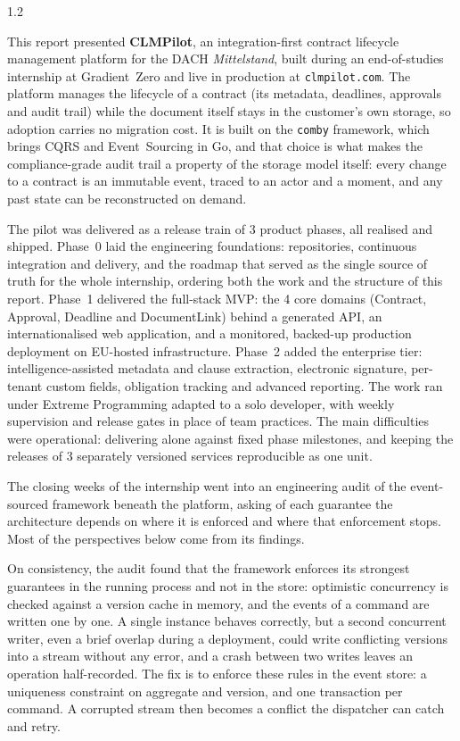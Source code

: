 \begin{spacing}{1.2}

This report presented \textbf{CLMPilot}, an integration-first contract
lifecycle management platform for the DACH \textit{Mittelstand}, built
during an end-of-studies internship at Gradient~Zero and live in
production at \texttt{clmpilot.com}. The platform manages the lifecycle
of a contract (its metadata, deadlines, approvals and audit trail)
while the document itself stays in the customer's own storage, so
adoption carries no migration cost. It is built on the \texttt{comby}
framework, which brings CQRS and Event~Sourcing in Go, and that choice
is what makes the compliance-grade audit trail a property of the
storage model itself: every change to a contract is an immutable event,
traced to an actor and a moment, and any past state can be
reconstructed on demand.

The pilot was delivered as a release train of 3 product phases, all
realised and shipped. Phase~0 laid the engineering foundations:
repositories, continuous integration and delivery, and the roadmap that
served as the single source of truth for the whole internship, ordering
both the work and the structure of this report. Phase~1 delivered the
full-stack MVP: the 4 core domains (Contract, Approval, Deadline and
DocumentLink) behind a generated API, an internationalised web
application, and a monitored, backed-up production deployment on
EU-hosted infrastructure. Phase~2 added the enterprise tier:
intelligence-assisted metadata and clause extraction, electronic
signature, per-tenant custom fields, obligation tracking and advanced
reporting. The work ran under Extreme Programming adapted to a solo
developer, with weekly supervision and release gates in place of team
practices. The main difficulties were operational: delivering alone
against fixed phase milestones, and keeping the releases of 3
separately versioned services reproducible as one unit.

\vspace{5mm}

The closing weeks of the internship went into an engineering audit of
the event-sourced framework beneath the platform, asking of each
guarantee the architecture depends on where it is enforced and where
that enforcement stops. Most of the perspectives below come from its
findings.

On consistency, the audit found that the framework enforces its
strongest guarantees in the running process and not in the store:
optimistic concurrency is checked against a version cache in memory,
and the events of a command are written one by one. A single instance
behaves correctly, but a second concurrent writer, even a brief
overlap during a deployment, could write conflicting versions into a
stream without any error, and a crash between two writes leaves an
operation half-recorded. The fix is to enforce these rules in the
event store: a uniqueness constraint on aggregate and version, and one
transaction per command. A corrupted stream then becomes a conflict
the dispatcher can catch and retry.


\end{spacing}
